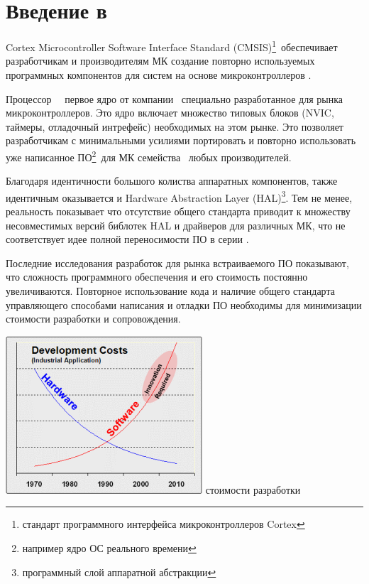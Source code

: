 \section{Введение в \cmsis}\label{cmsisintro}


Cortex Microcontroller Software Interface Standard (CMSIS)\footnote{стандарт
программного интерфейса микроконтроллеров Cortex}\ обеспечивает разработчикам и
производителям МК создание повторно используемых программных компонентов для
систем на основе микроконтроллеров \cm{}.

Процессор \arm\ \ первое ядро от компании \arm\ специально разработанное
для рынка микроконтроллеров. Это ядро включает множество типовых блоков (NVIC,
таймеры, отладочный интрефейс) необходимых на этом рынке. Это позволяет
разработчикам с минимальными усилиями портировать и повторно использовать уже
написанное ПО\footnote{например ядро ОС реального времени}\ для МК семейства
\ любых производителей.

Благодаря идентичности большого колиства аппаратных компонентов, также
идентичным оказывается и Hardware Abstraction Layer (HAL)\footnote{программный
слой аппаратной абстракции}.
Тем не менее, реальность показывает что отсутствие общего стандарта приводит к
множеству несовместимых версий библотек HAL и драйверов для различных МК, что не
соответствует идее полной переносимости ПО в серии .

Последние исследования разработок для рынка встраиваемого ПО показывают, что
сложность программного обеспечения и его стоимость постоянно увеличиваются.
Повторное использование кода и наличие общего стандарта управляющего способами
написания и отладки ПО необходимы для минимизации стоимости разработки и
сопровождения.

\includegraphics[height=30ex]{fig/cmsisdevcosts.png}
стоимости разработки

